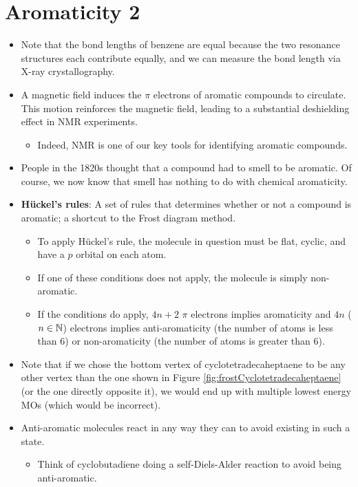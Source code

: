 \documentclass[../notes.tex]{subfiles}
\begin{document}
\section{Aromaticity 2}
\begin{itemize}
    \item {}Note that the bond lengths of benzene are equal because the two resonance structures each contribute equally, and we can measure the bond length via X-ray crystallography.
    \item A magnetic field induces the $\pi$ electrons of aromatic compounds to circulate. This motion reinforces the magnetic field, leading to a substantial deshielding effect in NMR experiments.
    \begin{itemize}
        \item Indeed, NMR is one of our key tools for identifying aromatic compounds.
    \end{itemize}
    \item People in the 1820s thought that a compound had to smell to be aromatic. Of course, we now know that smell has nothing to do with chemical aromaticity.
    \item \textbf{H\"{u}ckel's rules}: A set of rules that determines whether or not a compound is aromatic; a shortcut to the Frost diagram method.
    \begin{itemize}
        \item To apply H\"{u}ckel's rule, the molecule in question must be flat, cyclic, and have a $p$ orbital on each atom.
        \item If one of these conditions does not apply, the molecule is simply non-aromatic.
        \item If the conditions do apply, $4n+2$ $\pi$ electrons implies aromaticity and $4n$ ($n\in\mathbb{N}$) electrons implies anti-aromaticity (the number of atoms is less than 6) or non-aromaticity (the number of atoms is greater than 6).
    \end{itemize}
    \item Note that if we chose the bottom vertex of cyclotetradecaheptaene to be any other vertex than the one shown in Figure \ref{fig:frostCyclotetradecaheptaene} (or the one directly opposite it), we would end up with multiple lowest energy MOs (which would be incorrect).
    \item Anti-aromatic molecules react in any way they can to avoid existing in such a state.
    \begin{itemize}
        \item Think of cyclobutadiene doing a self-Diels-Alder reaction to avoid being anti-aromatic.

\end{itemize}
\end{itemize}
\end{document}

